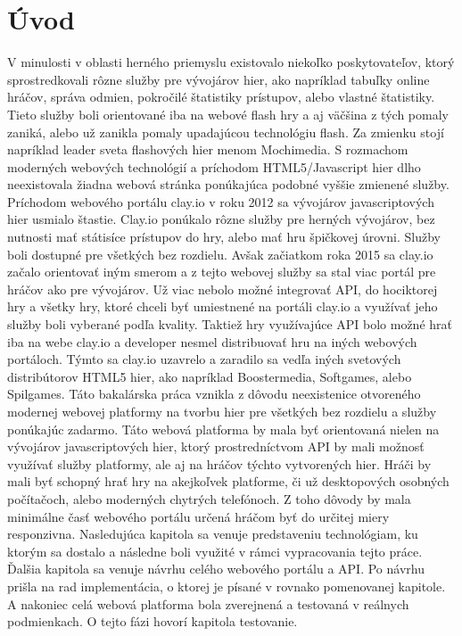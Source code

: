 
\chapter{Úvod}
V minulosti v oblasti herného priemyslu existovalo niekoľko poskytovateľov, ktorý sprostredkovali rôzne služby pre vývojárov hier, ako napríklad tabuľky online hráčov, správa odmien, pokročilé štatistiky prístupov, alebo vlastné štatistiky. Tieto služby boli orientované iba na webové flash hry a aj väčšina z tých pomaly zaniká, alebo už zanikla pomaly upadajúcou technológiu flash. Za zmienku stojí napríklad leader sveta flashových hier menom Mochimedia. S rozmachom moderných webových technológií a príchodom HTML5/Javascript hier dlho neexistovala žiadna webová stránka ponúkajúca podobné vyššie zmienené služby. Príchodom webového portálu clay.io v roku 2012 sa vývojárov javascriptových hier usmialo štastie. Clay.io ponúkalo rôzne služby pre herných vývojárov, bez nutnosti mať státisíce prístupov do hry, alebo mať hru špičkovej úrovni. Služby boli dostupné pre všetkých bez rozdielu. Avšak začiatkom roka 2015 sa clay.io začalo orientovať iným smerom a z tejto webovej služby sa stal viac portál pre hráčov ako pre vývojárov. Už viac nebolo možné integrovať API, do hociktorej hry a všetky hry, ktoré chceli byť umiestnené na portáli clay.io a využívať jeho služby boli vyberané podľa kvality. Taktiež hry využívajúce API bolo možné hrať iba na webe clay.io a developer nesmel distribuovať hru na iných webových portáloch. Týmto sa clay.io uzavrelo a zaradilo sa vedľa iných svetových distribútorov HTML5 hier, ako napríklad Boostermedia, Softgames, alebo Spilgames. 
Táto bakalárska práca vznikla z dôvodu neexistenice otvoreného modernej webovej platformy na tvorbu hier pre všetkých bez rozdielu a služby ponúkajúc zadarmo. Táto webová platforma by mala byť orientovaná nielen na vývojárov javascriptových hier, ktorý prostredníctvom API by mali možnosť využívať služby platformy, ale aj na hráčov týchto vytvorených hier. Hráči by mali byť schopný hrať hry na akejkoľvek platforme, či už desktopových osobných počítačoch, alebo moderných chytrých telefónoch. Z toho dôvody by mala minimálne časť webového portálu určená hráčom byť do určitej miery responzivna.
Nasledujúca kapitola sa venuje predstaveniu technológiam, ku ktorým sa dostalo a následne boli využité v rámci vypracovania tejto práce. Ďalšia kapitola sa venuje návrhu celého webového portálu a API. Po návrhu prišla na rad implementácia, o ktorej je písané v rovnako pomenovanej kapitole. A nakoniec celá webová platforma bola zverejnená a testovaná v reálnych podmienkach. O tejto fázi hovorí kapitola testovanie.

